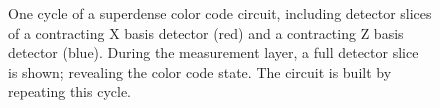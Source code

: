 \documentclass[onecolumn,unpublished,a4paper]{quantumarticle}
\theoremstyle{definition}
\theoremstyle{definition}
\theoremstyle{definition}
\begin{document}
\begin{figure}
    \centering
    \caption{
        One cycle of a superdense color code circuit, including detector slices of a contracting X basis detector (red) and a contracting Z basis detector (blue).
        During the measurement layer, a full detector slice is shown; revealing the color code state.
        The circuit is built by repeating this cycle.
}
\end{figure}
\end{document}
